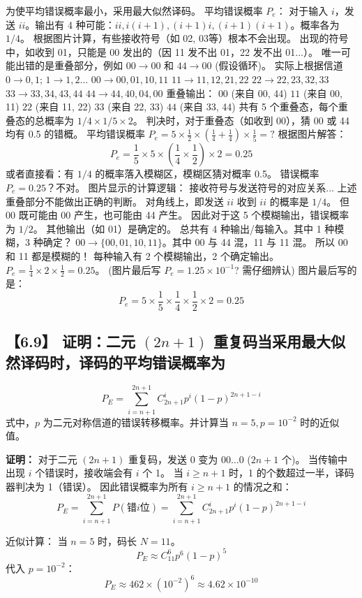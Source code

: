 \documentclass[11pt, a4paper]{article}
\begin{document}
为使平均错误概率最小，采用最大似然译码。
平均错误概率 $P_e$：
对于输入 $i$，发送 $ii$。输出有 4 种可能：$ii, i(i+1), (i+1)i, (i+1)(i+1)$。概率各为 $1/4$。
根据图片计算，有些接收符号（如 02, 03等）根本不会出现。
出现的符号中，如收到 01，只能是 00 发出的（因 11 发不出 01，22 发不出 01...）。
唯一可能出错的是重叠部分，例如 $00 \to 00$ 和 $44 \to 00$ (假设循环)。
实际上根据信道 $0 \to 0,1$; $1 \to 1,2$...
$00 \to 00, 01, 10, 11$
$11 \to 11, 12, 21, 22$
$22 \to 22, 23, 32, 33$
$33 \to 33, 34, 43, 44$
$44 \to 44, 40, 04, 00$
重叠输出：
$00$ (来自 00, 44)
$11$ (来自 00, 11)
$22$ (来自 11, 22)
$33$ (来自 22, 33)
$44$ (来自 33, 44)
共有 5 个重叠态，每个重叠态的总概率为 $1/4 \times 1/5 \times 2$。
判决时，对于重叠态（如收到 00），猜 00 或 44 均有 0.5 的错概。
平均错误概率 $P_e = 5 \times \frac{1}{2} \times (\frac{1}{4} + \frac{1}{4}) \times \frac{1}{5} = ?$
根据图片解答：
\[ P_e = \frac{1}{5} \times 5 \times (\frac{1}{4} \times \frac{1}{2}) \times 2 = 0.25 \]
或者直接看：有 $1/4$ 的概率落入模糊区，模糊区猜对概率 0.5。
错误概率 $P_e = 0.25$？不对。
图片显示的计算逻辑：
接收符号与发送符号的对应关系... 上述重叠部分不能做出正确的判断。
对角线上，即发送 $ii$ 收到 $ii$ 的概率是 $1/4$。
但 00 既可能由 00 产生，也可能由 44 产生。
因此对于这 5 个模糊输出，错误概率为 $1/2$。
其他输出（如 01）是确定的。
总共有 4 种输出/每输入。其中 1 种模糊，3 种确定？
$00 \to \{00, 01, 10, 11\}$。其中 00 与 44 混，11 与 11 混。
所以 00 和 11 都是模糊的！
每种输入有 2 个模糊输出，2 个确定输出。
$P_e = \frac{1}{4} \times 2 \times \frac{1}{2} = 0.25$。
(图片最后写 $P_e = 1.25 \times 10^{-1}$? 需仔细辨认)
图片最后写的是：
\[ P_e = 5 \times \frac{1}{5} \times \frac{1}{4} \times \frac{1}{2} \times 2 = 0.25 \]

\subsection*{【6.9】 证明：二元 $(2n+1)$ 重复码当采用最大似然译码时，译码的平均错误概率为}
\[ P_E = \sum_{i=n+1}^{2n+1} C_{2n+1}^i p^i (1-p)^{2n+1-i} \]
式中，$p$ 为二元对称信道的错误转移概率。并计算当 $n=5, p=10^{-2}$ 时的近似值。

\textbf{证明：}
对于二元 $(2n+1)$ 重复码，发送 0 变为 $00\dots0$ ($2n+1$ 个)。
当传输中出现 $i$ 个错误时，接收端会有 $i$ 个 1。
当 $i \ge n+1$ 时，1 的个数超过一半，译码器判决为 1（错误）。
因此错误概率为所有 $i \ge n+1$ 的情况之和：
\[ P_E = \sum_{i=n+1}^{2n+1} P(\text{错} i \text{位}) = \sum_{i=n+1}^{2n+1} C_{2n+1}^i p^i (1-p)^{2n+1-i} \]

近似计算：
当 $n=5$ 时，码长 $N=11$。
\[ P_E \approx C_{11}^6 p^6 (1-p)^5 \]
代入 $p=10^{-2}$：
\[ P_E \approx 462 \times (10^{-2})^6 \approx 4.62 \times 10^{-10} \]
\end{document}
